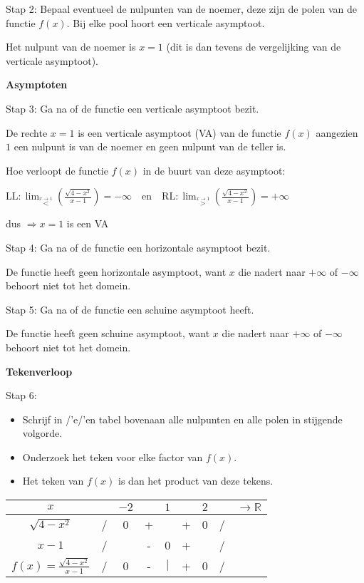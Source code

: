 \medskip{}


Stap 2: Bepaal eventueel de nulpunten van de noemer, deze zijn de
polen van de functie $f(x)$. Bij elke pool hoort een verticale asymptoot.

Het nulpunt van de noemer is $x=1$ (dit is dan tevens de vergelijking
van de verticale asymptoot).

\medskip{}


\textbf{Asymptoten}

Stap 3: Ga na of de functie een verticale asymptoot bezit. 

De rechte $x=1$ is een verticale asymptoot (VA) van de functie $f(x)$
aangezien $1$ een nulpunt is van de noemer en geen nulpunt van de
teller is.

Hoe verloopt de functie $f(x)$ in de buurt van deze asymptoot:

${\displaystyle \textrm{LL}:{\displaystyle {\displaystyle \lim_{\overset{x\rightarrow1}{<}}}\left(\frac{\sqrt{4-x^{2}}}{x-1}\right)=-\infty\quad\textrm{en}\quad{\displaystyle \textrm{RL}:\lim_{\overset{x\rightarrow1}{>}}}\left(\frac{\sqrt{4-x^{2}}}{x-1}\right)=+\infty}}$

dus ${\displaystyle \Rightarrow x=1}$ is een VA\medskip{}


Stap 4: Ga na of de functie een horizontale asymptoot bezit.

De functie heeft geen horizontale asymptoot, want $x$ die nadert
naar $+\infty$ of $-\infty$ behoort niet tot het domein.

\medskip{}


Stap 5: Ga na of de functie een schuine asymptoot heeft.

De functie heeft geen schuine asymptoot, want $x$ die nadert naar
$+\infty$ of $-\infty$ behoort niet tot het domein.\medskip{}


\textbf{Tekenverloop}

Stap 6:
\begin{itemize}
\item Schrijf in /'e/'en tabel bovenaan alle nulpunten en alle polen
	in stijgende volgorde. 
\item Onderzoek het teken voor elke factor van $f(x)$. 
\item Het teken van $f(x)$ is dan het product van deze tekens.
\end{itemize}
\medskip{}

\begin{table}
\centering
\begin{tabular}{|c||c|c|c|c|c|c|c|c|}
\hline 
$x$ &  & $-2$ &  & $1$ &  & $2$ &  & ${\displaystyle \longrightarrow\mathbb{R}}$\tabularnewline
\hline 
\hline 
${\displaystyle \sqrt{4-x^{2}}}$ & / & 0 & + &  & + & 0 & / & \tabularnewline
\hline 
${\displaystyle x-1}$ & / &  & - & 0 & + &  & / & \tabularnewline
\hline 
\hline 
${\displaystyle f(x)=\frac{\sqrt{4-x^{2}}}{x-1}}$ & / & 0 & - & $\mid$ & + & 0 & / & \tabularnewline
\hline 
\end{tabular}
\end{table}

